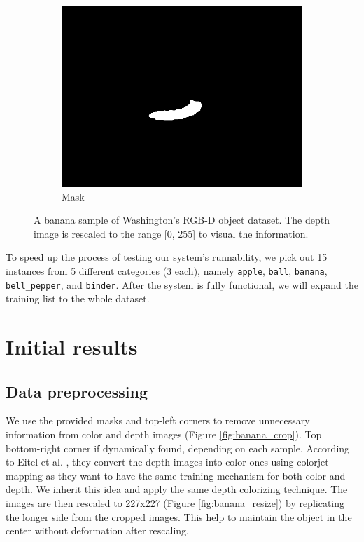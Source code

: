 \documentclass[paper=letter, fontsize=12pt]{article}
\begin{document}
\begin{figure}[htbp]
\begin{subfigure}[b]{0.32\linewidth}
		\includegraphics[width=\textwidth]{banana_1_1_1_mask}
		\caption{Mask}
	\end{subfigure}
	
	\caption{A banana sample of Washington's RGB-D object dataset. The depth image is rescaled to the range [0, 255] to visual the information.}
	\label{fig:banana}
\end{figure}

To speed up the process of testing our system's runnability, we pick out 15 instances from 5 different categories (3 each), namely \texttt{apple}, \texttt{ball}, \texttt{banana}, \texttt{bell\_pepper}, and \texttt{binder}. After the system is fully functional, we will expand the training list to the whole dataset.


\section{Initial results}
\subsection{Data preprocessing}
We use the provided masks and top-left corners to remove unnecessary information from color and depth images (Figure \ref{fig:banana_crop}). Top bottom-right corner if dynamically found, depending on each sample. According to Eitel et al. \cite{Eitel2015}, they convert the depth images into color ones using colorjet mapping as they want to have the same training mechanism for both color and depth. We inherit this idea and apply the same depth colorizing technique. The images are then rescaled to 227x227 (Figure \ref{fig:banana_resize}) by replicating the longer side from the cropped images. This help to maintain the object in the center without deformation after rescaling.
\end{document}
